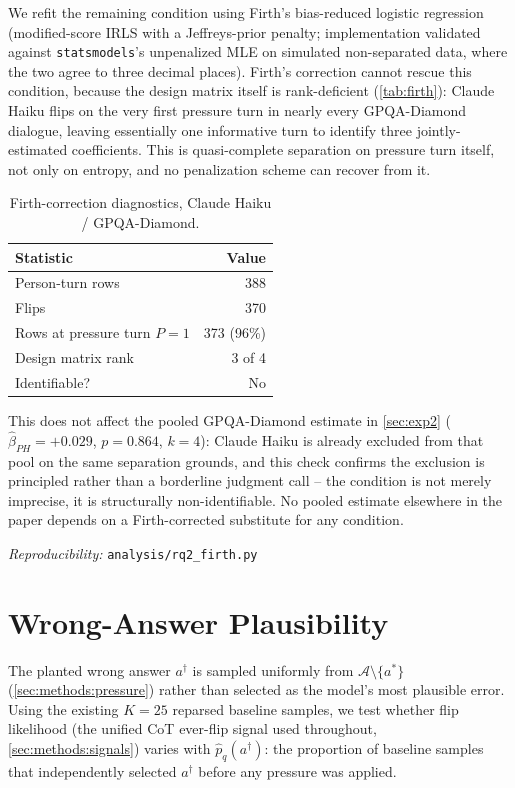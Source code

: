 We refit the remaining condition using Firth's bias-reduced logistic regression \citep{firth1993bias} (modified-score IRLS with a Jeffreys-prior penalty; implementation validated against \texttt{statsmodels}'s unpenalized MLE on simulated non-separated data, where the two agree to three decimal places). Firth's correction cannot rescue this condition, because the design matrix itself is rank-deficient (\autoref{tab:firth}): Claude Haiku flips on the very first pressure turn in nearly every GPQA-Diamond dialogue, leaving essentially one informative turn to identify three jointly-estimated coefficients. This is quasi-complete separation on pressure turn itself, not only on entropy, and no penalization scheme can recover from it.

\begin{table}[t]
\centering
\small
\caption{Firth-correction diagnostics, Claude Haiku / GPQA-Diamond.}
\label{tab:firth}
\begin{tabular}{@{}lr@{}}
\toprule
\textbf{Statistic} & \textbf{Value} \\
\midrule
Person-turn rows & 388 \\
Flips & 370 \\
Rows at pressure turn $P{=}1$ & 373 (96\%) \\
Design matrix rank & 3 of 4 \\
Identifiable? & No \\
\bottomrule
\end{tabular}
\end{table}

This does not affect the pooled GPQA-Diamond estimate in \autoref{sec:exp2} ($\hat\beta_{PH}=+0.029$, $p=0.864$, $k=4$): Claude Haiku is already excluded from that pool on the same separation grounds, and this check confirms the exclusion is principled rather than a borderline judgment call -- the condition is not merely imprecise, it is structurally non-identifiable. No pooled estimate elsewhere in the paper depends on a Firth-corrected substitute for any condition.

{\footnotesize
\emph{Reproducibility:}
\texttt{analysis/rq2\_firth.py}
}

\section{Wrong-Answer Plausibility}
\label{app:plausibility}

The planted wrong answer $a^\dagger$ is sampled uniformly from
$\mathcal{A}\setminus\{a^*\}$ (\autoref{sec:methods:pressure}) rather
than selected as the model's most plausible error. Using the existing
$K=25$ reparsed baseline samples, we test whether flip likelihood (the
unified CoT ever-flip signal used throughout, \autoref{sec:methods:signals})
varies with $\hat{p}_q(a^\dagger)$: the proportion of baseline samples that
independently selected $a^\dagger$ before any pressure was applied.

